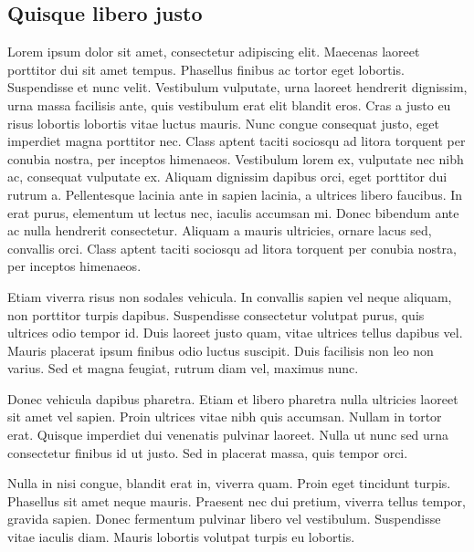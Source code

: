 \begin{apendicesenv}
	
	\partapendices
	
\chapter{Quisque libero justo}

Lorem ipsum dolor sit amet, consectetur adipiscing elit. Maecenas laoreet porttitor dui sit amet tempus. Phasellus finibus ac tortor eget lobortis. Suspendisse et nunc velit. Vestibulum vulputate, urna laoreet hendrerit dignissim, urna massa facilisis ante, quis vestibulum erat elit blandit eros. Cras a justo eu risus lobortis lobortis vitae luctus mauris. Nunc congue consequat justo, eget imperdiet magna porttitor nec. Class aptent taciti sociosqu ad litora torquent per conubia nostra, per inceptos himenaeos. Vestibulum lorem ex, vulputate nec nibh ac, consequat vulputate ex. Aliquam dignissim dapibus orci, eget porttitor dui rutrum a. Pellentesque lacinia ante in sapien lacinia, a ultrices libero faucibus. In erat purus, elementum ut lectus nec, iaculis accumsan mi. Donec bibendum ante ac nulla hendrerit consectetur. Aliquam a mauris ultricies, ornare lacus sed, convallis orci. Class aptent taciti sociosqu ad litora torquent per conubia nostra, per inceptos himenaeos.

Etiam viverra risus non sodales vehicula. In convallis sapien vel neque aliquam, non porttitor turpis dapibus. Suspendisse consectetur volutpat purus, quis ultrices odio tempor id. Duis laoreet justo quam, vitae ultrices tellus dapibus vel. Mauris placerat ipsum finibus odio luctus suscipit. Duis facilisis non leo non varius. Sed et magna feugiat, rutrum diam vel, maximus nunc.

Donec vehicula dapibus pharetra. Etiam et libero pharetra nulla ultricies laoreet sit amet vel sapien. Proin ultrices vitae nibh quis accumsan. Nullam in tortor erat. Quisque imperdiet dui venenatis pulvinar laoreet. Nulla ut nunc sed urna consectetur finibus id ut justo. Sed in placerat massa, quis tempor orci.

Nulla in nisi congue, blandit erat in, viverra quam. Proin eget tincidunt turpis. Phasellus sit amet neque mauris. Praesent nec dui pretium, viverra tellus tempor, gravida sapien. Donec fermentum pulvinar libero vel vestibulum. Suspendisse vitae iaculis diam. Mauris lobortis volutpat turpis eu lobortis.


\end{apendicesenv}
